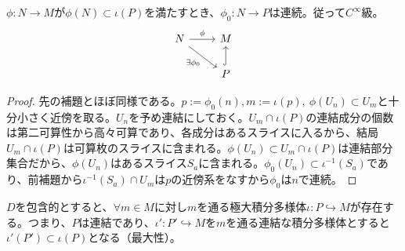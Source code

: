 \begin{thm}\label{thm131}
    $\phi:N\to M$が$\phi(N)\subset\iota(P)$を満たすとき、$\phi_0:N\to P$は連続。従って$C^\infty$級。
    \[\begin{tikzcd}
        N\arrow[rd,"\exists \phi_0"']\arrow[r,"\phi"] &M\\
        & P\arrow[u,hook]
    \end{tikzcd}\]
\end{thm}
\begin{proof}
    先の補題とほぼ同様である。$p:=\phi_0(n),m:=\iota(p),\ \phi(U_n)\subset U_m$と十分小さく近傍を取る。$U_n$を予め連結にしておく。$U_m\cap\iota(P)$の連結成分の個数は第二可算性から高々可算であり、各成分はあるスライスに入るから、結局$U_m\cap\iota(P)$は可算枚のスライスに含まれる。$\phi(U_n)\subset U_m\cap\iota(P)$は連結部分集合だから、$\phi(U_n)$はあるスライス$S_a$に含まれる。$\phi_0(U_n)\subset\iota^{-1}(S_a)$であり、前補題から$\iota^{-1}(S_a)\cap U_m$は$p$の近傍系をなすから$\phi_0$は$n$で連続。
\end{proof}
\begin{thm}[極大積分多様体]
    $D$を包含的とすると、$\forall m\in M$に対し$m$を通る極大積分多様体$\iota:P\hookrightarrow M$が存在する。つまり、$P$は連結であり、$\iota':P'\hookrightarrow M$を$m$を通る連結な積分多様体とすると$\iota'(P')\subset\iota(P)$となる（最大性）。
\end{thm}
